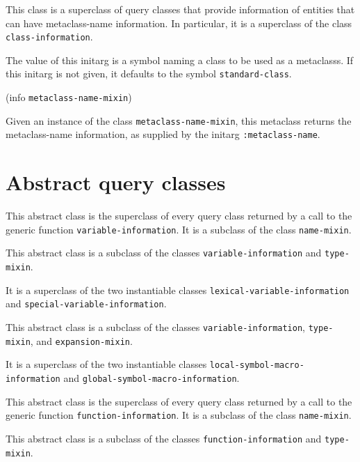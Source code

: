 This class is a superclass of query classes that provide information
of entities that can have metaclass-name information.  In
particular, it is a superclass of the class
\texttt{class-information}.


The value of this initarg is a symbol naming a class to be used as a
metaclasss.  If this initarg is not given, it defaults to the symbol
\texttt{standard-class}.

 {(info {\tt metaclass-name-mixin})}

Given an instance of the class \texttt{metaclass-name-mixin}, this
metaclass returns the metaclass-name information, as supplied by the
initarg \texttt{:metaclass-name}.

\section{Abstract query classes}


This abstract class is the superclass of every query class returned by
a call to the generic function \texttt{variable-information}.  It is a
subclass of the class \texttt{name-mixin}.


This abstract class is a subclass of the classes
\texttt{variable-information} and \texttt{type-mixin}.

It is a superclass of the two instantiable classes
\texttt{lexical-variable-information} and
\texttt{special-variable-information}.


This abstract class is a subclass of the classes
\texttt{variable-information}, \texttt{type-mixin}, and
\texttt{expansion-mixin}.

It is a superclass of the two instantiable classes
\texttt{local-symbol-macro-information} and
\texttt{global-symbol-macro-information}.


This abstract class is the superclass of every query class returned by
a call to the generic function \texttt{function-information}.  It is a
subclass of the class \texttt{name-mixin}.


This abstract class is a subclass of the classes
\texttt{function-information} and \texttt{type-mixin}.


